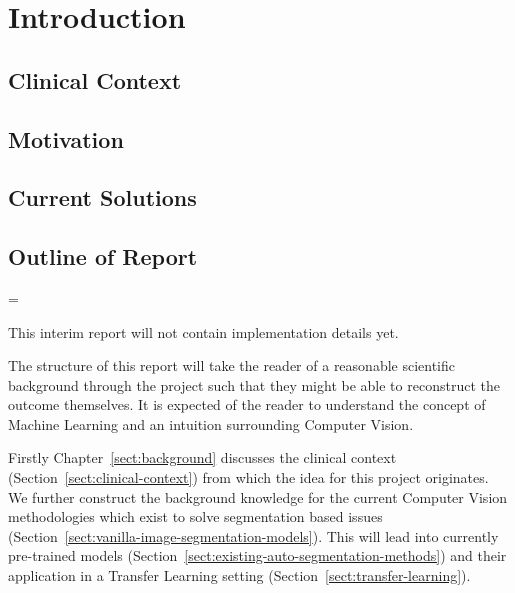 \documentclass[11pt,twoside]{report}
\newenvironment{warning}
  {\par\begin{mdframed}[linewidth=1pt,linecolor=black]%
    \begin{list}{}{\leftmargin=1cm
                   \labelwidth=\leftmargin}\item[\Large\ding{43}]}
  {\end{list}\end{mdframed}\par}
\begin{document}
\chapter{Introduction} \label{sect:intro}



\section{Clinical Context} \label{sect:clinical-context-summary}




\section{Motivation}\label{sect:motivation}

\section{Current Solutions}\label{sect:current-solutions}
% 

\section{Outline of Report}\label{sect:outline-of-report}

\begin{warning}
  This interim report will not contain implementation details yet.
\end{warning}

The structure of this report will take the reader of a reasonable scientific background through the project such that they might be able to reconstruct the outcome themselves. It is expected of the reader to understand the concept of Machine Learning and an intuition surrounding Computer Vision.

Firstly Chapter~\ref{sect:background} discusses the clinical context (Section~\ref{sect:clinical-context}) from which the idea for this project originates. We further construct the background knowledge for the current Computer Vision methodologies which exist to solve segmentation based issues (Section~\ref{sect:vanilla-image-segmentation-models}). This will lead into currently pre-trained models (Section~\ref{sect:existing-auto-segmentation-methods}) and their application in a Transfer Learning setting (Section~\ref{sect:transfer-learning}).
\end{document}
